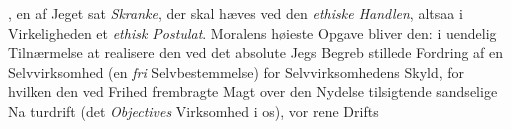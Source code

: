 \documentclass[12pt,a4paper]{book}
\begin{document}
{%
}, en
af Jeget sat \emph{Skranke}, der skal hæves ved den \emph{ethiske
Handlen}, altsaa i Virkeligheden et \emph{ethisk Postulat}.
Moralens høieste Opgave bliver den: i uendelig Tilnærmelse
at realisere den ved det absolute Jegs Begreb stillede
Fordring af en Selvvirksomhed (en \emph{fri} Selvbestemmelse)
for Selvvirksomhedens Skyld, for hvilken den ved Frihed
frembragte Magt over den Nydelse tilsigtende sandselige Na\-%
turdrift (det \emph{Objectives} Virksomhed i os), vor rene Drifts
\end{document}
